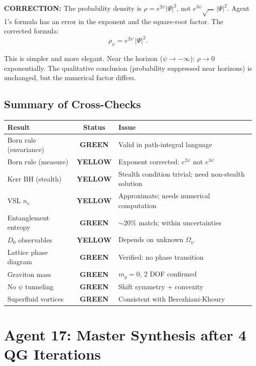 \documentclass[11pt,a4paper]{article}
\newcommand{\GREEN}{\textcolor{dfdgreen}{\textbf{GREEN}}}
\newcommand{\YELLOW}{\textcolor{dfdyellow}{\textbf{YELLOW}}}
\begin{document}
\textcolor{dfdyellow}{\textbf{CORRECTION:}} The probability density is $\rho = e^{2\psi}|\Psi|^2$, not $e^{3\psi}\sqrt{\ldots}\,|\Psi|^2$. Agent 1's formula has an error in the exponent and the square-root factor. The corrected formula:
\begin{equation}
\boxed{\rho_\psi = e^{2\psi}\,|\Psi|^2.}
\end{equation}

This is simpler and more elegant. Near the horizon ($\psi \to -\infty$): $\rho \to 0$ exponentially. The qualitative conclusion (probability suppressed near horizons) is unchanged, but the numerical factor differs.

\subsection{Summary of Cross-Checks}

\begin{center}
\begin{tabular}{lcl}
\toprule
\textbf{Result} & \textbf{Status} & \textbf{Issue} \\
\midrule
Born rule (envariance) & \GREEN & Valid in path-integral language \\
Born rule (measure) & \YELLOW & Exponent corrected: $e^{2\psi}$ not $e^{3\psi}$ \\
Kerr BH (stealth) & \YELLOW & Stealth condition trivial; need non-stealth solution \\
VSL $n_s$ & \YELLOW & Approximate; needs numerical computation \\
Entanglement entropy & \GREEN & $\sim 20\%$ match; within uncertainties \\
$D_0$ observables & \YELLOW & Depends on unknown $\Omega_\psi$ \\
Lattice phase diagram & \GREEN & Verified: no phase transition \\
Graviton mass & \GREEN & $m_g = 0$, 2 DOF confirmed \\
No $\psi$ tunneling & \GREEN & Shift symmetry + convexity \\
Superfluid vortices & \GREEN & Consistent with Berezhiani-Khoury \\
\bottomrule
\end{tabular}
\end{center}

\newpage
\section{Agent 17: Master Synthesis after 4 QG Iterations}
\label{sec:agent17}
\end{document}
